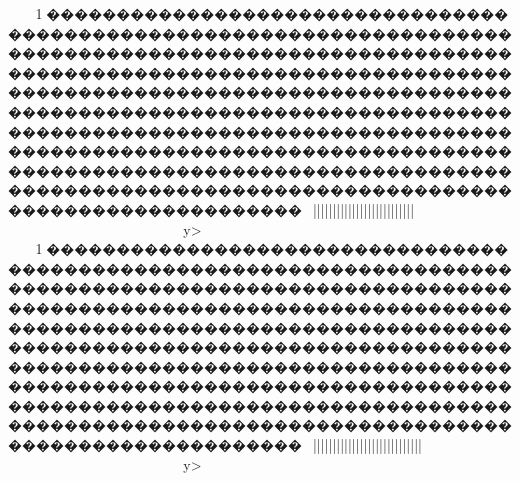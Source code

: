 {{{{{{{{{{{{{{{{{{{{{{{{{{{{{{{{{{{{{{{{{{{{{{{{{{{{{{{{{{{{{{{{{{{{{{{{{{{{{{{{{{{{{{{{{{{{{{{{{{{{{{{{{{{{{{{{{{{{{{{{{{{{{{{{{{{{{{{{{{{{{{{{{{{{{{{{{{{{{{{{{{{{{{{{{{{{{{{{{{{{{{{{{{{{{{{{{{{{{{{{{{{{{{{{{{{{{{{{{{{{{{{{{{{{{{{{{{{{{{{{{{{{{{{{{{{{{{{{{{{{{{{{{{{{{{{{{{{{{{{{{{{{{{{{{{{{{{{{{{{{{{{{{{{{{{{{{{{{{{{{{{{{{{{{{{{{{{{{{{{{{{{{{{{{{{{{{{{{{{{{{{{{{{{{{{{{{{{{{{{{{{{{{{{{{{{{{{{{{{{{{{{{{{{{{{{{{{{{{{{{{{{{{{{{{{{{{{{{{{{{{{{{{{{{{{{{{{{{{{{{{{{{{{{{{{{{{{{{{{{{{{{{{{{{{{{{{{{{{{{{{{{{{{{{{{{{{{{{{{{{{{{{{{{{{{{{{{{{{{{{{{{{{{{{{{{{{{{{{{{{{{{{{{{{{{{{{{{{{{{{{{{{{{{{{{{{{{{{{{{{{{{{{{{{{{{{{{{{{{{{{{{{{{{{{{{{{{{{{{{{{{{{{{{{{{{{{{{{{{{{{{{{{{{{{{{{{{{{{{{{{{{{{{{{{{{{{{{{{{{{{{{{{{{{{{{{{{{{{{{{{{{{{{{{{{{{{{{{{{{{{{{{{{{{{{{{{{{{{{{{{{{{{{{{{{{{{{{{{{{{{{{{{{{{{{{{{{{{{{{{{{{{{{{{{{{{{{{{{{{{{{{{{{{{{{{{{{{{{{{{{{{{{{{{{{{{{{{{{{{{{{{{{{{{{{{{{{{{{{{{{{{{{{{{{{{{{{{{{{{{{{{{{{{{{{{{{{{{{{{{{{{{{{{{{{{{{{{{{{{{{{{{{{{{{{{{{{{{{{{{{{{{{{{{{{{{{{{{{{{{{{{{{{{{{{{{{{{{{{{{{{{{{{{{{{{{{{{{{{{{1\ky������������������������������������������������������������������������������������������������������������������������������������������������������������������������������������������������������������������������������������������������������������������������������������������������������������������������������������������������������������������������������������������~}}||}}}}}||||||||{{{{{{{{{{{{{{{{||||||||||||||||}}}}~~~~~~~~~~~~~~~~~~~~y>
1\ky������������������������������������������������������������������������������������������������������������������������������������������������������������������������������������������������������������������������������������������������������������������������������������������������������������������������������������������������������������������������������������������~}}||}}}}}||||||||{{{{{{{{||{{{{{{||||||||||||||||}}}}~~~~~~~~~~~~~~~~~~~~y>
}}}}}}}}}}}}}}}}}}}}}}}}}}}}}}}}}}}}}}}}}}}}}}}}}}}}}}}}}}}}}}}}}}}}}}}}}}}}}}}}}}}}}}}}}}}}}}}}}}}}}}}}}}}}}}}}}}}}}}}}}}}}}}}}}}}}}}}}}}}}}}}}}}}}}}}}}}}}}}}}}}}}}}}}}}}}}}}}}}}}}}}}}}}}}}}}}}}}}}}}}}}}}}}}}}}}}}}}}}}}}}}}}}}}}}}}}}}}}}}}}}}}}}}}}}}}}}}}}}}}}}}}}}}}}}}}}}}}}}}}}}}}}}}}}}}}}}}}}}}}}}}}}}}}}}}}}}}}}}}}}}}}}}}}}}}}}}}}}}}}}}}}}}}}}}}}}}}}}}}}}}}}}}}}}}}}}}}}}}}}}}}}}}}}}}}}}}}}}}}}}}}}}}}}}}}}}}}}}}}}}}}}}}}}}}}}}}}}}}}}}}}}}}}}}}}}}}}}}}}}}}}}}}}}}}}}}}}}}}}}}}}}}}}}}}}}}}}}}}}}}}}}}}}}}}}}}}}}}}}}}}}}}}}}}}}}}}}}}}}}}}}}}}}}}}}}}}}}}}}}}}}}}}}}}}}}}}}}}}}}}}}}}}}}}}}}}}}}}}}}}}}}}}}}}}}}}}}}}}}}}}}}}}}}}}}}}}}}}}}}}}}}}}}}}}}}}}}}}}}}}}}}}}}}}}}}}}}}}}}}}}}}}}}}}}}}}}}}}}}}}}}}}}}}}}}}}}}}}}}}}}}}}}}}}}}}}}}}}}}}}}}}}}}}}}}}}}}}}}}}}}}}}}}}}}}}}}}}}}}}}}}}}}}}}}}}}}}}}}}}}}}}}}}}}}}}}}}}}}}}}}}}}}}}}}}}}}}}}}}}}}}}}}}}}}}}}}}}}}}}}}}}}}}}}}}}}}}}}}}}}}}}}}}}}}}}}}}}}}}}}}}}}}}}}}}}}}}}}}}}}}}}}}}}}}}}}}}}}}}}}}}}}}}}}}}}}}}}}}}}}}}}}}}}}}}}}}}}}}}}}}}}}}}}}}}}}}}}}}}}}}}}}}}}}}}}}}}}}}}}}}}}}}}}
